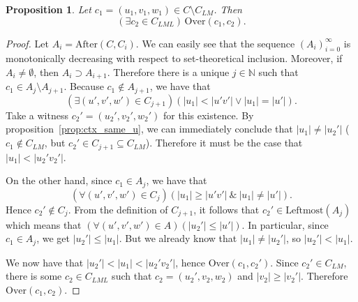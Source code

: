 \documentclass{article}
\newtheorem{proposition}[definition]{Proposition}
\newcommand{\len}[1]{\ensuremath{\left| #1 \right|}}
\begin{document}
	\begin{proposition} \label{prop:ctx_over}
		Let $c_1 = (u_1, v_1, w_1)\in C\setminus C_{LM}$.
		Then \[ (\exists c_2\in C_{LML})\,\mathrm{Over}(c_1, c_2). \]
	\end{proposition}
	\begin{proof}
		Let $A_i = \mathrm{After}(C, C_i)$. We can easily see that the sequence $(A_i)_{i=0}^\infty$ is monotonically decreasing with respect to set-theoretical inclusion. Moreover, if $A_i\ne\emptyset$, then $A_i\supset A_{i+1}$. Therefore there is a unique $j\in \mathbb{N}$ such that $c_1\in A_j\setminus A_{j+1}$.
		Because $c_1\notin A_{j+1}$, we have that
		\[ (\exists (u', v', w')\in C_{j+1})(\len{u_1} < \len{u'v'} \lor \len{u_1} = \len{u'}). \]
		Take a witness $c_2' = (u_2', v_2', w_2')$ for this existence.
		By proposition~\ref{prop:ctx_same_u}, we can immediately conclude that $\len{u_1} \ne \len{u_2'}$ ($c_1\notin C_{LM}$, but $c_2'\in C_{j+1}\subseteq C_{LM}$).
		Therefore it must be the case that $\len{u_1} < \len{u_2'v_2'}$.
		
		On the other hand, since $c_1\in A_j$, we have that
		\[ (\forall (u', v', w') \in C_j)(\len{u_1} \ge \len{u'v'}\ \&\ \len{u_1} \ne \len{u'}). \]
		Hence $c_2'\notin C_j$. From the definition of $C_{j+1}$, it follows that $c_2'\in \mathrm{Leftmost}(A_j)$ which means that
		$(\forall (u', v', w') \in A)(\len{u_2'} \le \len{u'})$.
		In particular, since $c_1\in A_j$, we get $\len{u_2'} \le \len{u_1}$. But we already know that $\len{u_1} \ne \len{u_2'}$, so $\len{u_2'} < \len{u_1}$.
		
		We now have that $\len{u_2'} < \len{u_1} < \len{u_2'v_2'}$, hence $\mathrm{Over}(c_1, c_2')$.
		Since $c_2'\in C_{LM}$, there is some $c_2\in C_{LML}$ such that $c_2 = (u_2', v_2, w_2)$ and $\len{v_2}\ge \len{v_2'}$.
		Therefore $\mathrm{Over}(c_1, c_2)$.
	\end{proof}
\end{document}
